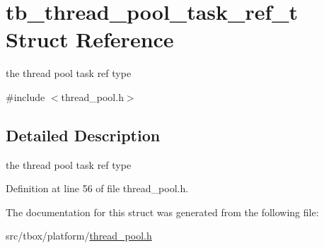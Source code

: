 \hypertarget{structtb__thread__pool__task__ref__t}{\section{tb\-\_\-thread\-\_\-pool\-\_\-task\-\_\-ref\-\_\-t Struct Reference}
\label{structtb__thread__pool__task__ref__t}
}


the thread pool task ref type  




{\ttfamily \#include $<$thread\-\_\-pool.\-h$>$}



\subsection{Detailed Description}
the thread pool task ref type 

Definition at line 56 of file thread\-\_\-pool.\-h.



The documentation for this struct was generated from the following file\-:\begin{DoxyCompactItemize}
\item 
src/tbox/platform/\hyperlink{thread__pool_8h}{thread\-\_\-pool.\-h}\end{DoxyCompactItemize}
